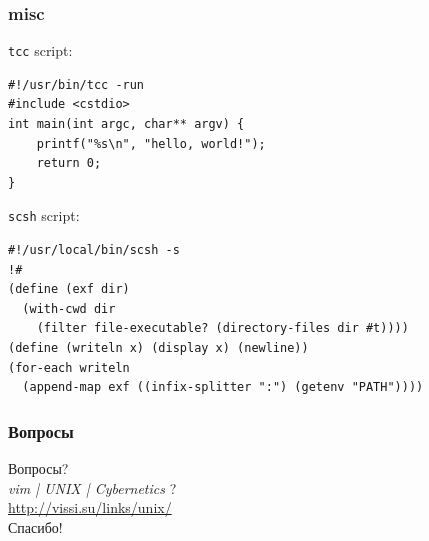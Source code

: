 \documentclass[hyperref={unicode=true}]{beamer}
\begin{document}
\begin{frame}[fragile]
	\frametitle{misc}

	\texttt{tcc} script:
	\begin{addmargin}[1em]{0em}
		\begin{verbatim}
#!/usr/bin/tcc -run
#include <cstdio>
int main(int argc, char** argv) {
    printf("%s\n", "hello, world!");
    return 0;
}
		\end{verbatim}
	\end{addmargin}

	\texttt{scsh} script:
	\begin{addmargin}[1em]{0em}
		\begin{verbatim}
#!/usr/local/bin/scsh -s
!#
(define (exf dir)
  (with-cwd dir
    (filter file-executable? (directory-files dir #t))))
(define (writeln x) (display x) (newline))
(for-each writeln
  (append-map exf ((infix-splitter ":") (getenv "PATH"))))
		\end{verbatim}
	\end{addmargin}
\end{frame}

\frame
{
	\frametitle{Вопросы}
	
	\begin{center}
	Вопросы?\\
	\vspace{15pt}
	\textit{vim | UNIX | Cybernetics} ?\\
	\vspace{15pt}
	\url{http://vissi.su/links/unix/}\\
	\vspace{25pt}
	Спасибо!
	\end{center}

}
\end{document}
